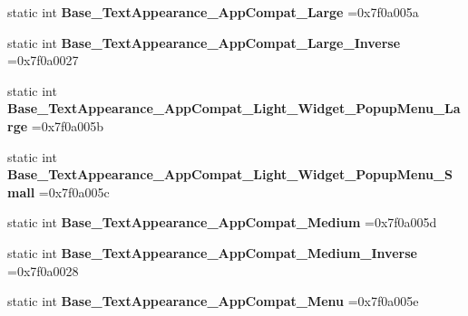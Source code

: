 \begin{DoxyCompactItemize}
\item 
\mbox{\label{classandroid_1_1support_1_1v4_1_1R_1_1style_ab4bc7ceb7829d04e25ce6ee4244fd9a2}} 
static int {\bfseries Base\+\_\+\+Text\+Appearance\+\_\+\+App\+Compat\+\_\+\+Large} =0x7f0a005a
\item 
\mbox{\label{classandroid_1_1support_1_1v4_1_1R_1_1style_a69ac7c311b2cca0b0ca07361513f033b}} 
static int {\bfseries Base\+\_\+\+Text\+Appearance\+\_\+\+App\+Compat\+\_\+\+Large\+\_\+\+Inverse} =0x7f0a0027
\item 
\mbox{\label{classandroid_1_1support_1_1v4_1_1R_1_1style_a7e82da4a5aa963b7d06593d8158349cc}} 
static int {\bfseries Base\+\_\+\+Text\+Appearance\+\_\+\+App\+Compat\+\_\+\+Light\+\_\+\+Widget\+\_\+\+Popup\+Menu\+\_\+\+Large} =0x7f0a005b
\item 
\mbox{\label{classandroid_1_1support_1_1v4_1_1R_1_1style_a11721d0e39c06c88f791b063f6afb166}} 
static int {\bfseries Base\+\_\+\+Text\+Appearance\+\_\+\+App\+Compat\+\_\+\+Light\+\_\+\+Widget\+\_\+\+Popup\+Menu\+\_\+\+Small} =0x7f0a005c
\item 
\mbox{\label{classandroid_1_1support_1_1v4_1_1R_1_1style_afbbec8a281857f430999a4056ac9bd64}} 
static int {\bfseries Base\+\_\+\+Text\+Appearance\+\_\+\+App\+Compat\+\_\+\+Medium} =0x7f0a005d
\item 
\mbox{\label{classandroid_1_1support_1_1v4_1_1R_1_1style_a597bae8c9a884d5803838e9ca922ad22}} 
static int {\bfseries Base\+\_\+\+Text\+Appearance\+\_\+\+App\+Compat\+\_\+\+Medium\+\_\+\+Inverse} =0x7f0a0028
\item 
\mbox{\label{classandroid_1_1support_1_1v4_1_1R_1_1style_a2d7a54f2184141276208b48b0f2906ba}} 
static int {\bfseries Base\+\_\+\+Text\+Appearance\+\_\+\+App\+Compat\+\_\+\+Menu} =0x7f0a005e
\item 
\mbox{\label{classandroid_1_1support_1_1v4_1_1R_1_1style_a41418f2efe3e82857440a5da8bb51534}} 

\end{DoxyCompactItemize}
